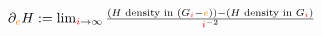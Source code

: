 \documentclass[crop,equation,convert={outext=.svg,command=\unexpanded{pdf2svg \infile\space\outfile}},multi=false]{standalone}
\begin{document}
\color{white}
\Large
    $\partial_{\color{orange}e} H :=\lim_{{\color{red}i}\to\infty}\frac{(H \text{ density in
    }(G_{\color{red}i}-{\color{orange}e})) - (H \text{ density in }G_{\color{red}i})}{{\color{red}i}^{-2}}$
\end{document}
